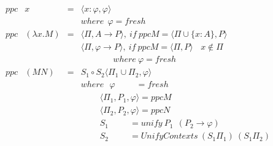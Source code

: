 \begin{equation*}
\begin{array}{llll}
ppc & x & = & \langle x:\varphi,\varphi \rangle\\
&&& where\ \ \varphi=fresh\\
ppc & (\lambda x.M) & = & \langle \Pi,A \rightarrow P \rangle,\ if\ ppcM=\langle \Pi \cup \{x:A\},P \rangle\\
&&& \langle \Pi,\varphi \rightarrow P \rangle,\ if\ ppcM=\langle \Pi ,P \rangle\ \ \ \ x\not\in \Pi\\
&&&\ \ \ \ \ \ \ \ \ \ \ \ \ \ \ \ \ where\ \varphi=fresh\\
ppc & (MN) & = & S_1\circ S_2\langle \Pi _1\cup \Pi _2,\varphi \rangle\\
&&& where\ \ \ \varphi \ \ \ \ \ \ \ \ \ \ \ = fresh\\
&&& \ \ \ \ \ \ \ \ \ \ \langle \Pi _1,P_1,\varphi \rangle = ppcM\\
&&& \ \ \ \ \ \ \ \ \ \ \langle \Pi _2,P_2,\varphi \rangle = ppcN\\
&&& \ \ \ \ \ \ \ \ \ \ S_1 \ \ \ \ \ \ \ \ \ \ \ = unify\ P_1\ \ (P_2 \rightarrow \varphi)\\
&&& \ \ \ \ \ \ \ \ \ \ S_2 \ \ \ \ \ \ \ \ \ \ \ = UnifyContexts\ (S_1\Pi _1)\ (S_1\Pi _2)\\
\end{array}
\end{equation*}
